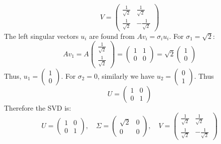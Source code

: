 \documentclass[lang=cn,11pt]{elegantbook}
\begin{document}
\begin{solution}
\[
V = \begin{pmatrix} \frac{1}{\sqrt{2}} & \frac{1}{\sqrt{2}} \\[3pt] \frac{1}{\sqrt{2}} & -\frac{1}{\sqrt{2}} \end{pmatrix}
\]
The left singular vectors $u_i$ are found from \( A v_i = \sigma_i u_i \).
For \( \sigma_1 = \sqrt{2} \):
\[
A v_1 = A \begin{pmatrix} \frac{1}{\sqrt{2}} \\[3pt] \frac{1}{\sqrt{2}} \end{pmatrix}
= \begin{pmatrix}1 & 1 \\[3pt] 0 & 0\end{pmatrix} 
= \sqrt{2} \begin{pmatrix} 1 \\ 0\end{pmatrix}
\]
Thus, \( u_1 = \begin{pmatrix}1 \\ 0\end{pmatrix} \). For \( \sigma_2 = 0 \), similarly we have \(
u_2 = \begin{pmatrix}0 \\ 1\end{pmatrix}\).
Thus
\[
U = \begin{pmatrix} 1 & 0 \\ 0 & 1 \end{pmatrix}
\]
Therefore the SVD is:
$$
U = \begin{pmatrix} 1 & 0 \\ 0 & 1 \end{pmatrix}, \quad  \Sigma = \begin{pmatrix} \sqrt{2} & 0\\ 0 & 0 \end{pmatrix}     ,  \quad V = \begin{pmatrix} \frac{1}{\sqrt{2}} & \frac{1}{\sqrt{2}} \\ \frac{1}{\sqrt{2}} & -\frac{1}{\sqrt{2}} \end{pmatrix}
$$
 \end{solution}
\end{document}
